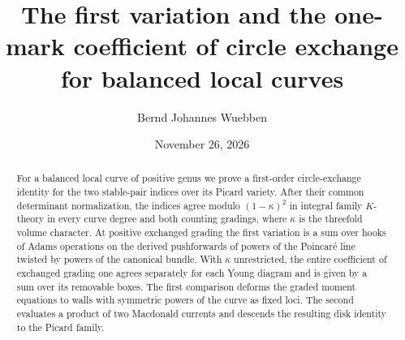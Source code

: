 \documentclass[11pt]{amsart}
\title[Refined circle exchange for balanced local curves]{The first variation and the one-mark coefficient of circle exchange for balanced local curves}
\author{Bernd Johannes Wuebben}
\date{November 26, 2026}
\theoremstyle{definition}\newtheorem{example}[theorem]{Example}
\begin{document}
\begin{abstract}
For a balanced local curve of positive genus we prove a first-order
circle-exchange identity for the two stable-pair indices over its
Picard variety. After their common determinant normalization, the
indices agree modulo $(1-\kappa)^2$ in integral family $K$-theory
in every curve degree and both counting gradings, where $\kappa$ is
the threefold volume character. At positive exchanged grading the
first variation is a sum over hooks of Adams operations on the
derived pushforwards of powers of the Poincar\'e line twisted by
powers of the canonical bundle. With $\kappa$ unrestricted, the
entire coefficient of exchanged grading one agrees separately for
each Young diagram and is given by a sum over its removable boxes.
The first comparison deforms the graded moment equations to walls
with symmetric powers of the curve as fixed loci. The second
evaluates a product of two Macdonald currents and descends the
resulting disk identity to the Picard family.
\end{abstract}
\maketitle








\end{document}
